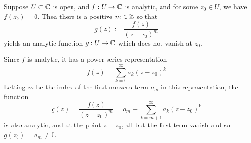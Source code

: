 \documentclass{homework}
\begin{document}
                                                                                                                  \begin{problem}\label{factor-theorem}
                                                                                                                    Suppose $U \subset \mathbb{C}$ is open, and $f : U \to \mathbb{C}$ is analytic, and for some $z_0 \in U$, we have $f(z_0) = 0$.  Then there is a positive $m \in \mathbb{Z}$ so that
                                                                                                                      \[
                                                                                                                          g(z) := \frac{f(z)}{(z-z_0)^m}
                                                                                                                            \]
                                                                                                                              yields an analytic function $g : U \to \mathbb{C}$ which does not vanish at $z_0$.
                                                                                                                              \end{problem}
                                                                                                                              \begin{solution}
                                                                                                                              Since $f$ is analytic, it has a power series representation 
                                                                                                                              \[
                                                                                                                              f(z) = \sum_{k=0}^\infty a_k(z-z_0)^k
                                                                                                                              \]
                                                                                                                              Letting $m$ be the index of the first nonzero term $a_m$ in this representation, the function 
                                                                                                                              \[
                                                                                                                              g(z) = \frac{f(z)}{(z-z_0)^m} =  a_m + \sum_{k=m+1}^\infty a_k(z-z_0)^k
                                                                                                                              \]
                                                                                                                              is also analytic, and at the point $z=z_0$, all but the first term vanish and so $g(z_0)=a_m\neq 0$.
                                                                                                                              \end{solution}
\end{document}
